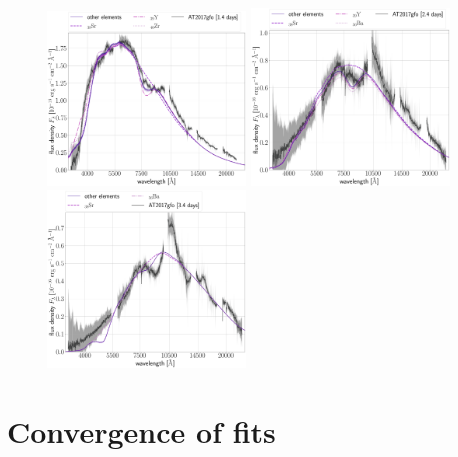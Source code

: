 \documentclass[twocolumn, twocolappendix]{aastex63}
\begin{document}
\begin{figure}[!ht]
    \centering
    \includegraphics[width=0.47\textwidth]{figs/appendix/230503_184337_leaveoneout_all_TARDIS_evals_label-interest-38-39-40.png}
    \includegraphics[width=0.47\textwidth]{figs/appendix/230504_003423_leaveoneout_all_TARDIS_evals_label-interest-38-39-56.png}
    \includegraphics[width=0.47\textwidth]{figs/appendix/230628_205804_leaveoneout_all_TARDIS_evals_label-interest-38-56.png}
    \label{fig:leave_out_nonpref}
\end{figure}





\section{Convergence of fits}\label{app:convergence}
\end{document}
